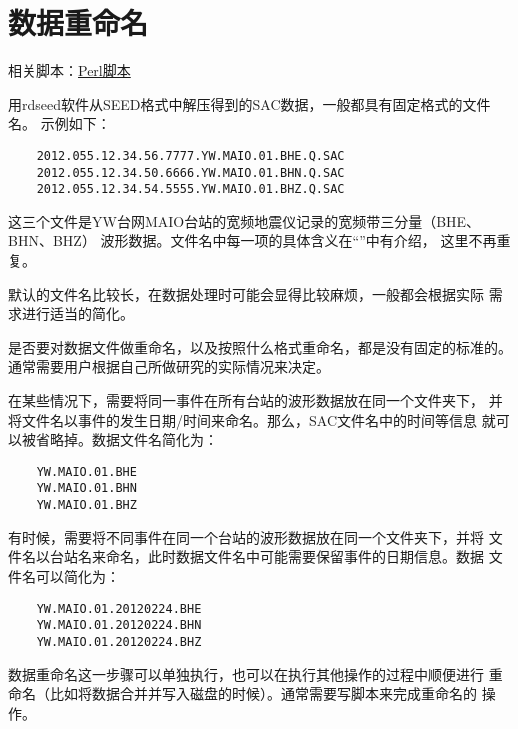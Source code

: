 \section{数据重命名}
相关脚本：\hyperref[subsec:rename-in-perl]{Perl脚本}

用rdseed软件从SEED格式中解压得到的SAC数据，一般都具有固定格式的文件名。
示例如下：
\begin{verbatim}
    2012.055.12.34.56.7777.YW.MAIO.01.BHE.Q.SAC
    2012.055.12.34.50.6666.YW.MAIO.01.BHN.Q.SAC
    2012.055.12.34.54.5555.YW.MAIO.01.BHZ.Q.SAC
\end{verbatim}
这三个文件是YW台网MAIO台站的宽频地震仪记录的宽频带三分量（BHE、BHN、BHZ）
波形数据。文件名中每一项的具体含义在``''中有介绍，
这里不再重复。

默认的文件名比较长，在数据处理时可能会显得比较麻烦，一般都会根据实际
需求进行适当的简化。

是否要对数据文件做重命名，以及按照什么格式重命名，都是没有固定的标准的。
通常需要用户根据自己所做研究的实际情况来决定。

在某些情况下，需要将同一事件在所有台站的波形数据放在同一个文件夹下，
并将文件名以事件的发生日期/时间来命名。那么，SAC文件名中的时间等信息
就可以被省略掉。数据文件名简化为：
\begin{verbatim}
    YW.MAIO.01.BHE
    YW.MAIO.01.BHN
    YW.MAIO.01.BHZ
\end{verbatim}

有时候，需要将不同事件在同一个台站的波形数据放在同一个文件夹下，并将
文件名以台站名来命名，此时数据文件名中可能需要保留事件的日期信息。数据
文件名可以简化为：
\begin{verbatim}
    YW.MAIO.01.20120224.BHE
    YW.MAIO.01.20120224.BHN
    YW.MAIO.01.20120224.BHZ
\end{verbatim}

数据重命名这一步骤可以单独执行，也可以在执行其他操作的过程中顺便进行
重命名（比如将数据合并并写入磁盘的时候）。通常需要写脚本来完成重命名的
操作。
